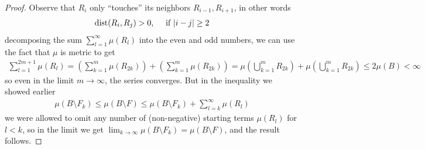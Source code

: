 \begin{proof}
  Observe that $R_i$ only ``touches'' its neighbors $R_{i-1},R_{i+1}$, in other words
  \begin{align*}
    \text{dist}(R_i,R_j) > 0, \quad \text{ if } \vert i-j\vert \geq 2
  \end{align*}
  decomposing the sum $\sum_{l=1}^{\infty} \mu(R_l)$ into the even and odd numbers,
  we can use the fact that $\mu$ is metric to get
  \begin{align*}
    \sum_{l=1}^{2m + 1} \mu(R_l) = 
    \left(\sum_{k=1}^{m} \mu(R_{2k})\right)
      +
    \left(
      \sum_{k=1}^{m} \mu(R_{2k})
    \right)
    = \mu \left(
        \bigcup_{k=1}^{m} R_{2k}
      \right)
      +
    \mu \left(
      \bigcup_{k=1}^{m} R_{2k}
    \right)
    \leq 2 \mu(B) < \infty
  \end{align*}
  so even in the limit $m \to \infty$, the series converges.
  But in the inequality we showed earlier
  \begin{align*}
    \mu(B \setminus F_k) \leq \mu(B \setminus F) \leq \mu(B \setminus F_k) + \sum_{l=k}^{\infty} \mu(R_l)
  \end{align*}
  we were allowed to omit any number of (non-negative) starting terms $\mu(R_l)$ for $l < k$, so in the limit we get $\lim_{k \to \infty} \mu(B \setminus F_k) = \mu(B \setminus F)$, and the result follows.
\end{proof}


